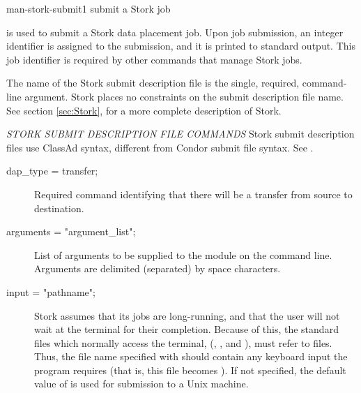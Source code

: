\begin{ManPage}{}{man-stork-submit}{1}
{submit a Stork job}

\Synopsis {}
\ToolArgsBase

\Storkname
{}


\Description 

 is used to submit a Stork data placement job.
Upon job submission, an integer identifier is assigned to the
submission,
	and it is printed to standard output.
This job identifier is required by other commands
that manage Stork jobs.

The name of the Stork submit description file is the single,
required, command-line argument.
Stork places no constraints on the submit
description file name.
See section \ref{sec:Stork}, for a more 
complete description of Stork.

\emph{STORK SUBMIT DESCRIPTION FILE COMMANDS}
Stork submit description files use ClassAd syntax, different from Condor submit
file syntax.  See .

\begin{description}

\item[dap\_type = transfer;]
Required command identifying that there will be
a transfer from source to destination.


\item[arguments = "\lt{}argument\_list\gt{}";]
List of arguments to be supplied
to the module on the command line.
Arguments are delimited (separated) by space characters.


\item[input = "\lt{}pathname\gt{}";]
Stork assumes that its jobs are
long-running, and that the user will not wait at the terminal for their
completion. Because of this, the standard files which normally access
the terminal, (, , and ),
must refer to files. Thus,
the file name specified with  should contain any keyboard
input the program requires (that is, this file becomes ).
If not specified, the default value
of  is used for submission to a Unix machine.


\end{description}
\end{ManPage}
